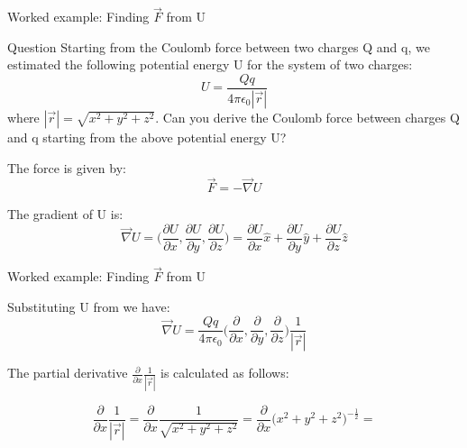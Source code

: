 {
\problemslide

%
%
%

\begin{frame}{Worked example: Finding $\vec{F}$ from U}

\begin{blockexmplque}{Question}
Starting from the Coulomb force between two charges Q and q,
we estimated the following potential energy U for the system of two charges:
\begin{equation*}
  U = \frac{Qq}{4\pi\epsilon_0 |\vec{r}|}
\end{equation*}
where $|\vec{r}| = \sqrt{x^2 + y^2 + z^2}$.
Can you derive the Coulomb force between charges Q and q
starting from the above potential energy U?
\end{blockexmplque}

The force is given by:
\begin{equation*}
  \vec{F} = -\vec{\nabla}U
\end{equation*}

The gradient of U is:
\begin{equation*}
  \vec{\nabla}U =
     \Big(
       \frac{\partial U}{\partial x},
       \frac{\partial U}{\partial y},
       \frac{\partial U}{\partial z}
     \Big) =
     \frac{\partial U}{\partial x} \hat{x} +
     \frac{\partial U}{\partial y} \hat{y} +
     \frac{\partial U}{\partial z} \hat{z}
\end{equation*}

\end{frame}

%
%
%

\begin{frame}{Worked example: Finding $\vec{F}$ from U}

Substituting U from we have:
\begin{equation*}
  \vec{\nabla}U =
     \frac{Qq}{4 \pi \epsilon_0}
     \Big(
       \frac{\partial}{\partial x},
       \frac{\partial}{\partial y},
       \frac{\partial}{\partial z}
     \Big) \frac{1}{|\vec{r}|}
\end{equation*}

The partial derivative $\frac{\partial}{\partial x} \frac{1}{|\vec{r}|}$ is calculated as follows:

\begin{equation*}
  \frac{\partial}{\partial x} \frac{1}{|\vec{r}|} =
  \frac{\partial}{\partial x} \frac{1}{\sqrt{x^2 + y^2 + z^2}} =
  \frac{\partial}{\partial x} \Big( x^2 + y^2 + z^2 \Big) ^{-\frac{1}{2}} =
\end{equation*}


\end{frame}}
